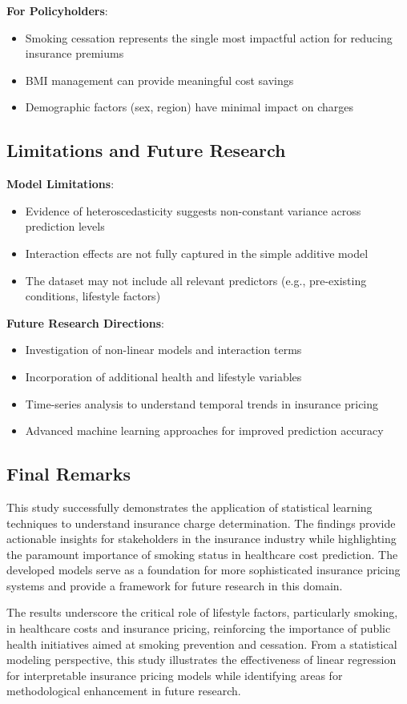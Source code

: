 \documentclass[12pt,a4paper]{article}
\begin{document}
\textbf{For Policyholders}:
\begin{itemize}
    \item Smoking cessation represents the single most impactful action for reducing insurance premiums
    \item BMI management can provide meaningful cost savings
    \item Demographic factors (sex, region) have minimal impact on charges
\end{itemize}

\subsection{Limitations and Future Research}

\textbf{Model Limitations}:
\begin{itemize}
    \item Evidence of heteroscedasticity suggests non-constant variance across prediction levels
    \item Interaction effects are not fully captured in the simple additive model
    \item The dataset may not include all relevant predictors (e.g., pre-existing conditions, lifestyle factors)
\end{itemize}

\textbf{Future Research Directions}:
\begin{itemize}
    \item Investigation of non-linear models and interaction terms
    \item Incorporation of additional health and lifestyle variables
    \item Time-series analysis to understand temporal trends in insurance pricing
    \item Advanced machine learning approaches for improved prediction accuracy
\end{itemize}

\subsection{Final Remarks}

This study successfully demonstrates the application of statistical learning techniques to understand insurance charge determination. The findings provide actionable insights for stakeholders in the insurance industry while highlighting the paramount importance of smoking status in healthcare cost prediction. The developed models serve as a foundation for more sophisticated insurance pricing systems and provide a framework for future research in this domain.

The results underscore the critical role of lifestyle factors, particularly smoking, in healthcare costs and insurance pricing, reinforcing the importance of public health initiatives aimed at smoking prevention and cessation. From a statistical modeling perspective, this study illustrates the effectiveness of linear regression for interpretable insurance pricing models while identifying areas for methodological enhancement in future research.
\end{document}
